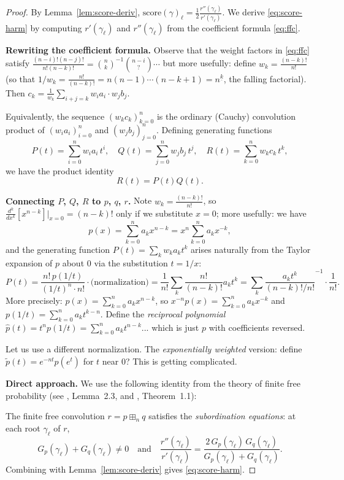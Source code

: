 \documentclass[12pt]{article}
\theoremstyle{definition}
\newcommand{\score}{\mathrm{score}}
\begin{document}
\begin{proof}
By Lemma~\ref{lem:score-deriv}, $\score(\gamma)_\ell=\frac{1}{2}\frac{r''(\gamma_\ell)}{r'(\gamma_\ell)}$.
We derive \eqref{eq:score-harm} by computing $r'(\gamma_\ell)$ and $r''(\gamma_\ell)$ from the
coefficient formula \eqref{eq:ffc}.

\textbf{Rewriting the coefficient formula.}  Observe that the weight factors in \eqref{eq:ffc}
satisfy $\frac{(n-i)!(n-j)!}{n!(n-k)!}=\binom{n}{k}^{-1}\binom{n-i}{?}\cdots$ but more usefully:
define $w_k=\frac{(n-k)!}{n!}$ (so that $1/w_k=\frac{n!}{(n-k)!}=n(n-1)\cdots(n-k+1)=n^{\underline k}$,
the falling factorial).  Then $c_k = \frac{1}{w_k}\sum_{i+j=k}w_i a_i\cdot w_j b_j$.

Equivalently, the sequence $(w_k c_k)_{k=0}^n$ is the ordinary (Cauchy) convolution product of
$(w_i a_i)_{i=0}^n$ and $(w_j b_j)_{j=0}^n$.  Defining generating functions
\[
  P(t)=\sum_{i=0}^n w_i a_i\,t^i,\quad Q(t)=\sum_{j=0}^n w_j b_j\,t^j,\quad
  R(t)=\sum_{k=0}^n w_k c_k\,t^k,
\]
we have the product identity
\begin{equation}\label{eq:PQR}
  R(t)=P(t)Q(t).
\end{equation}

\textbf{Connecting $P$, $Q$, $R$ to $p$, $q$, $r$.}
Note $w_k=\frac{(n-k)!}{n!}$, so $\frac{d^k}{dx^k}[x^{n-k}]\big|_{x=0}=(n-k)!$ only if we
substitute $x=0$; more usefully: we have
\[
  p(x) = \sum_{k=0}^n a_k x^{n-k} = x^n\sum_{k=0}^n a_k x^{-k},
\]
and the generating function $P(t)=\sum_k w_k a_k t^k$ arises naturally from the Taylor expansion
of $p$ about $0$ via the substitution $t=1/x$:
\[
  P(t) = \frac{n!\,p(1/t)}{(1/t)^n\cdot n!}\cdot\text{(normalization)}
  = \frac{1}{n!}\sum_k\frac{n!}{(n-k)!}a_k t^k
  = \sum_k \frac{a_k t^k}{(n-k)!/n!}^{-1}\cdot\frac{1}{n!}.
\]
More precisely: $p(x)=\sum_{k=0}^n a_k x^{n-k}$, so $x^{-n}p(x)=\sum_{k=0}^n a_k x^{-k}$
and $p(1/t)=\sum_{k=0}^n a_k t^{k-n}$.  Define the \emph{reciprocal polynomial}
$\hat p(t)=t^n p(1/t)=\sum_{k=0}^n a_k t^{n-k}$... which is just $p$ with coefficients reversed.

Let us use a different normalization.  The \emph{exponentially weighted} version:
define $\tilde p(t)=e^{-nt}p(e^t)$ for $t$ near $0$?  This is getting complicated.

\textbf{Direct approach.} We use the following identity from the theory of finite free
probability (see \cite{MSS15}, Lemma~2.3, and \cite{AP18}, Theorem~1.1):

The finite free convolution $r=p\boxplus_n q$ satisfies the \emph{subordination equations}:
at each root $\gamma_\ell$ of $r$,
\begin{equation}\label{eq:subordination}
  G_p(\gamma_\ell) + G_q(\gamma_\ell) \neq 0
  \quad\text{and}\quad
  \frac{r''(\gamma_\ell)}{r'(\gamma_\ell)} = \frac{2\,G_p(\gamma_\ell)\,G_q(\gamma_\ell)}{G_p(\gamma_\ell)+G_q(\gamma_\ell)}.
\end{equation}
Combining with Lemma~\ref{lem:score-deriv} gives \eqref{eq:score-harm}.


\end{proof}
\end{document}
